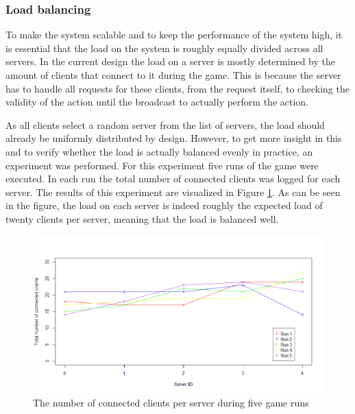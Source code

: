 \subsubsection{Load balancing}
\label{subsubsec:exp_load}
To make the system scalable and to keep the performance of the system high, it is essential that the load on the system is roughly equally divided across all servers.
In the current design the load on a server is mostly determined by the amount of clients that connect to it during the game. 
This is because the server has to handle all requests for these clients, from the request itself, to checking the validity of the action until the broadcast to actually perform the action.

As all clients select a random server from the list of servers, the load should already be uniformly distributed by design.
However, to get more insight in this and to verify whether the load is actually balanced evenly in practice, an experiment was performed. 
For this experiment five runs of the game were executed. In each run the total number of connected clients was logged for each server. 
The results of this experiment are visualized in Figure \ref{fig:connected_players_plot}. 
As can be seen in the figure, the load on each server is indeed roughly the expected load of twenty clients per server, meaning that the load is balanced well.

\begin{figure}[h!]
  \centering
    \includegraphics[width=\textwidth]{images/connected_players_plot}
    
  \caption{The number of connected clients per server during five game runs}
  \label{fig:connected_players_plot}
\end{figure}
